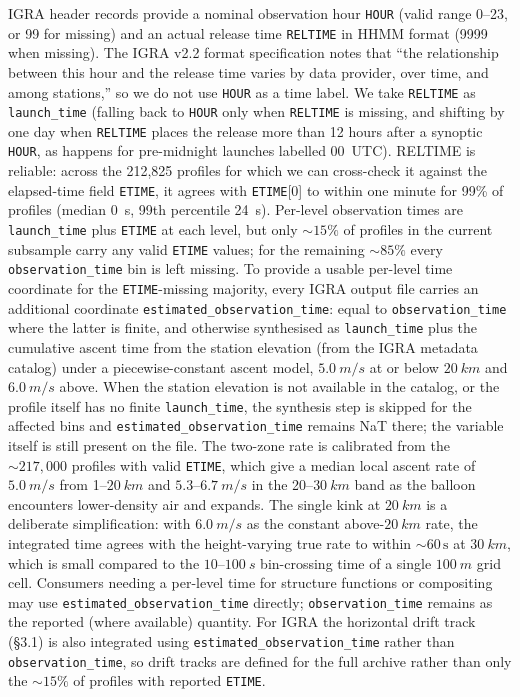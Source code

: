 \documentclass[11pt]{article}
\begin{document}
IGRA header records provide a nominal observation hour \texttt{HOUR} (valid range 0--23, or 99 for missing) and an actual release time \texttt{RELTIME} in HHMM format (9999 when missing).  The IGRA v2.2 format specification notes that ``the relationship between this hour and the release time varies by data provider, over time, and among stations,'' so we do not use \texttt{HOUR} as a time label.  We take \texttt{RELTIME} as \texttt{launch\_time} (falling back to \texttt{HOUR} only when \texttt{RELTIME} is missing, and shifting by one day when \texttt{RELTIME} places the release more than 12 hours after a synoptic \texttt{HOUR}, as happens for pre-midnight launches labelled 00~UTC).  RELTIME is reliable: across the 212,825 profiles for which we can cross-check it against the elapsed-time field \texttt{ETIME}, it agrees with \texttt{ETIME}[0] to within one minute for 99\% of profiles (median 0~s, 99th percentile 24~s).  Per-level observation times are \texttt{launch\_time} plus \texttt{ETIME} at each level, but only ${\sim}15\%$ of profiles in the current subsample carry any valid \texttt{ETIME} values; for the remaining ${\sim}85\%$ every \texttt{observation\_time} bin is left missing.  To provide a usable per-level time coordinate for the \texttt{ETIME}-missing majority, every IGRA output file carries an additional coordinate \texttt{estimated\_observation\_time}: equal to \texttt{observation\_time} where the latter is finite, and otherwise synthesised as \texttt{launch\_time} plus the cumulative ascent time from the station elevation (from the IGRA metadata catalog) under a piecewise-constant ascent model, $\SI{5.0}{m/s}$ at or below $\SI{20}{km}$ and $\SI{6.0}{m/s}$ above.  When the station elevation is not available in the catalog, or the profile itself has no finite \texttt{launch\_time}, the synthesis step is skipped for the affected bins and \texttt{estimated\_observation\_time} remains NaT there; the variable itself is still present on the file.  The two-zone rate is calibrated from the $\sim\!217{,}000$ profiles with valid \texttt{ETIME}, which give a median local ascent rate of $\SI{5.0}{m/s}$ from 1--$\SI{20}{km}$ and $\SI{5.3}$--$\SI{6.7}{m/s}$ in the 20--$\SI{30}{km}$ band as the balloon encounters lower-density air and expands.  The single kink at $\SI{20}{km}$ is a deliberate simplification: with $\SI{6.0}{m/s}$ as the constant above-$\SI{20}{km}$ rate, the integrated time agrees with the height-varying true rate to within ${\sim}60\,\mathrm{s}$ at $\SI{30}{km}$, which is small compared to the $\SI{10}$--$\SI{100}{s}$ bin-crossing time of a single $\SI{100}{m}$ grid cell.  Consumers needing a per-level time for structure functions or compositing may use \texttt{estimated\_observation\_time} directly; \texttt{observation\_time} remains as the reported (where available) quantity.  For IGRA the horizontal drift track (\S3.1) is also integrated using \texttt{estimated\_observation\_time} rather than \texttt{observation\_time}, so drift tracks are defined for the full archive rather than only the ${\sim}15\%$ of profiles with reported \texttt{ETIME}.
\end{document}
